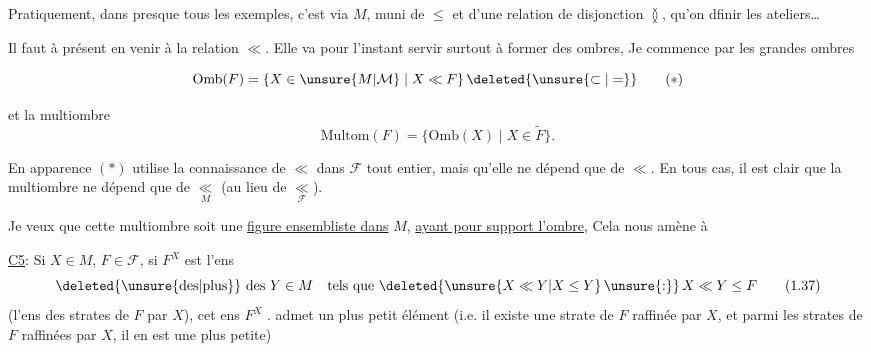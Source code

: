 Pratiquement, dans presque tous les exemples, c'est via $M$, muni de $\leq$ et d'une relation de disjonction $\between$, qu'on dfinir les ateliers\ldots

Il faut à présent en venir à la relation $\ll$.  Elle va pour l'instant servir surtout à former des ombres, Je commence par les grandes ombres


\[
 \mathrm{Omb}(F)=\{X\in\unsure{M|\mathcal{M}}\mid X\ll F\}\,\deleted{\unsure{\subset|=}}
 \tag*{$(*)$}
\]

et la multiombre
\[
 \mathrm{Multom}(F)=\{\mathrm{Omb}(X)\mid X\in\widetilde F\}.
 \tag*{$(**)$}
\]

En apparence $(*)$ utilise la connaissance de $\ll$ dans $\mathcal{F}$ tout entier, mais    qu'elle ne dépend que de $\ll$. En tous cas, il est clair que la multiombre ne dépend que de $\underset{M}{\ll}$ (au lieu de $\underset{\mathcal{F}}{\ll}$).


Je veux que cette multiombre soit une \uline{figure ensembliste dans} $M$, \uline{ayant pour support l'ombre},  Cela nous amène à


\uline{C5}: Si $X\in M$, $F\in\mathcal{F}$,  si $F^X$ est l'ens
\[
 \text{\deleted{\unsure{des|plus}} des }Y\in M\quad\text{tels que }\deleted{\unsure{X\ll Y|X\leq Y}\,\unsure{:}}\,X\ll Y\leq F
 \tag*{(1.37)}
\]
(l'ens des strates de $F$  par $X$),  cet ens $F^X$ . admet un plus petit élément  (i.e. il existe une strate de $F$ raffinée par $X$, et parmi  les strates de $F$ raffinées par $X$, il en est une plus petite)

